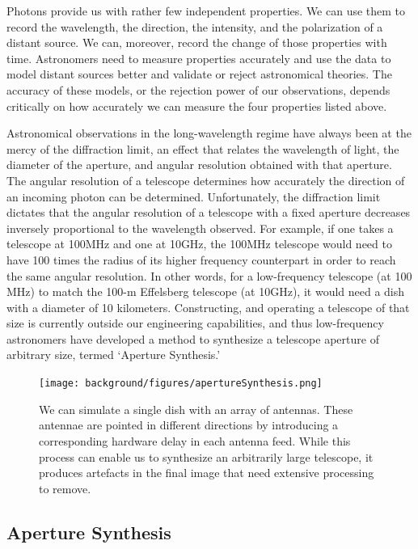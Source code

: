 Photons provide us with rather few independent properties. We can use them to record the wavelength, the direction, the intensity, and the polarization of a distant source. We can, moreover, record the change of those properties with time. Astronomers need to measure properties accurately and use the data to model distant sources  better and validate or reject astronomical theories. The accuracy of these models, or the rejection power of our observations, depends critically on how accurately we can measure the four properties listed above. 

Astronomical observations in the long-wavelength regime have always been at the mercy of the diffraction limit, an effect that relates the wavelength of light, the diameter of the aperture, and angular resolution obtained with that aperture. The angular resolution of a telescope determines how accurately the direction of an incoming photon can be determined. Unfortunately, the diffraction limit dictates that the angular resolution of a telescope with a fixed aperture decreases inversely proportional to the wavelength observed. For example, if one takes a telescope at 100MHz and one at 10GHz, the 100MHz telescope would need to have 100 times the radius of its higher frequency counterpart in order to reach the same angular resolution. In other words, for a low-frequency telescope (at 100 MHz) to match the 100-m Effelsberg telescope (at 10GHz), it would need a dish with a diameter of 10 kilometers. Constructing, and operating a telescope of that size is currently outside our engineering capabilities, and thus low-frequency astronomers have developed a method to synthesize a telescope aperture of arbitrary size, termed `Aperture Synthesis.' 

\begin{figure}[h]
    \centering
    \texttt{[image: background/figures/apertureSynthesis.png]}
    \caption[Graphical representation of aperture synthesis]{We can simulate a single dish with an array of antennas. These antennae are pointed in different directions by introducing a corresponding hardware delay in each antenna feed. While this process can enable us to synthesize an arbitrarily large telescope, it produces artefacts in the final image that need extensive processing to remove. }
    \label{fig:aperture_synthesis}
\end{figure}


\subsection{Aperture Synthesis}

